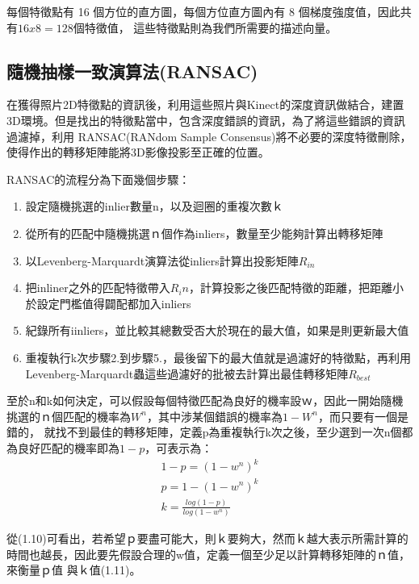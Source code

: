      每個特徵點有 16 個方位的直方圖，每個方位直方圖內有 8 個梯度強度值，因此共有$ 16 x 8 = 128$個特徵值，
     這些特徵點則為我們所需要的描述向量。

\subsection{隨機抽樣一致演算法(RANSAC)}

	在獲得照片2D特徵點的資訊後，利用這些照片與Kinect的深度資訊做結合，建置3D環境。但是找出的特徵點當中，包含深度錯誤的資訊，為了將這些錯誤的資訊過濾掉，利用
RANSAC(RANdom Sample Consensus)將不必要的深度特徵刪除，使得作出的轉移矩陣能將3D影像投影至正確的位置。%

	RANSAC的流程分為下面幾個步驟：
　\begin{enumerate}
	  \item 設定隨機挑選的inlier數量n，以及迴圈的重複次數ｋ
	  \item 從所有的匹配中隨機挑選ｎ個作為inliers，數量至少能夠計算出轉移矩陣
	  \item 以Levenberg-Marquardt演算法從inliers計算出投影矩陣$R_{in}$
	  \item 把inliner之外的匹配特徵帶入$R_in$，計算投影之後匹配特徵的距離，把距離小於設定門檻值得闢配都加入inliers
	  \item 紀錄所有iinliers，並比較其總數受否大於現在的最大值，如果是則更新最大值
	  \item 重複執行k次步驟2.到步驟5.，最後留下的最大值就是過濾好的特徵點，再利用Levenberg-Marquardt蟲這些過濾好的批被去計算出最佳轉移矩陣$R_{best}$
 \end{enumerate}

	至於n和k如何決定，可以假設每個特徵匹配為良好的機率設ｗ，因此一開始隨機挑選的ｎ個匹配的機率為$W^n$，其中涉某個錯誤的機率為$1-W^n$，而只要有一個是錯的，
就找不到最佳的轉移矩陣，定義p為重複執行k次之後，至少選到一次n個都為良好匹配的機率即為$1-p$，可表示為：
\begin{align}
	1-p = (1-w^n)^k   \\
	p = 1 - (1-w^n)^k \\
	k = \frac{log(1-p)}{log(1-w^n)} 
\end{align}

    從(1.10)可看出，若希望ｐ要盡可能大，則ｋ要夠大，然而ｋ越大表示所需計算的時間也越長，因此要先假設合理的w值，定義一個至少足以計算轉移矩陣的ｎ值，來衡量ｐ值
與ｋ值(1.11)。
